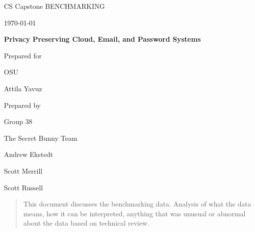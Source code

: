 
\def \CapstoneTeamName{		The Secret Bunny Team}
\def \CapstoneTeamNumber{		38}
\def \GroupMemberOne{			Andrew Ekstedt}
\def \GroupMemberTwo{			Scott Merrill}
\def \GroupMemberThree{			Scott Russell}
\def \CapstoneProjectName{		Privacy Preserving Cloud, Email, and Password Systems}
\def \CapstoneSponsorCompany{	OSU}
\def \CapstoneSponsorPerson{		Attila Yavuz}

\def \DocType{	%
				BENCHMARKING
				}
                
\renewcommand{\NameSigPair}[1]{#1}

\begin{titlepage}
    \begin{singlespace}
        \hfill 
        \par\vspace{.2in}
        \centering
        \scshape{
            \huge CS Capstone \DocType \par
            {\large\today}\par
            \vspace{.5in}
            \textbf{\Huge\CapstoneProjectName}\par
            \vfill
            {\large Prepared for}\par
            \Huge \CapstoneSponsorCompany\par
            \vspace{5pt}
            {\Large\NameSigPair{\CapstoneSponsorPerson}\par}
            {\large Prepared by }\par
            Group\CapstoneTeamNumber\par
            \CapstoneTeamName\par 
            \vspace{5pt}
            {\Large
                \NameSigPair{\GroupMemberOne}\par
                \NameSigPair{\GroupMemberTwo}\par
                \NameSigPair{\GroupMemberThree}\par
            }
            \vspace{20pt}
        }
        \begin{abstract}
        	This document discusses the benchmarking data. Analysis of what the data means, how it can be interpreted, anything that was unusual or abnormal about the data based on technical review.
       
        \end{abstract}     
    \end{singlespace}
\end{titlepage}
